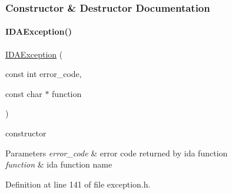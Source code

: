 \subsubsection{Constructor \& Destructor Documentation}
\mbox{\label{classamici_1_1_i_d_a_exception_ac01f061945cc83140822b1e6c69761fb}} 
\paragraph{\texorpdfstring{IDAException()}{IDAException()}}
{\footnotesize\ttfamily \mbox{\hyperlink{classamici_1_1_i_d_a_exception}{I\+D\+A\+Exception}} (\begin{DoxyParamCaption}\item[{const int}]{error\+\_\+code,  }\item[{const char $\ast$}]{function }\end{DoxyParamCaption})}

constructor 
\begin{DoxyParams}{Parameters}
{\em error\+\_\+code} & error code returned by ida function \\
\hline
{\em function} & ida function name \\
\hline
\end{DoxyParams}


Definition at line 141 of file exception.\+h.

